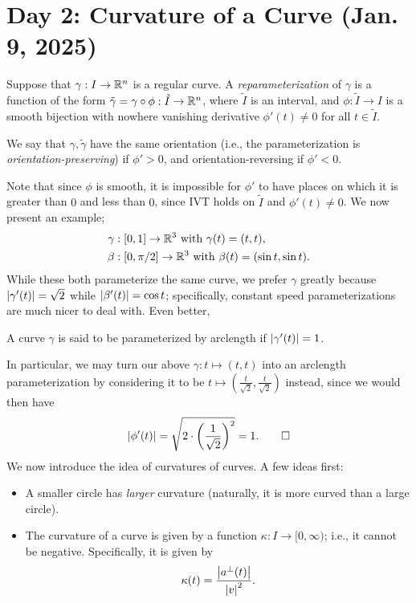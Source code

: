 \section{Day 2: Curvature of a Curve (Jan. 9, 2025)}
\begin{definition}
    Suppose that $\gamma : I \to \mathbb R^n$ is a regular curve. A \textit{reparameterization} of $\gamma$ is a function of the form $\tilde{\gamma} = \gamma \circ \phi : \tilde{I} \to \mathbb R^n$, where $\tilde{I}$ is an interval, and $\phi : \tilde{I} \to I$ is a smooth bijection with nowhere vanishing derivative $\phi'(t) \neq 0$ for all $t \in \tilde{I}$.
\end{definition}
\begin{definition}
    We say that $\gamma, \tilde{\gamma}$ have the same orientation (i.e., the parameterization is \textit{orientation-preserving}) if $\phi' > 0$, and orientation-reversing if $\phi' < 0$.
\end{definition}
\noindent Note that since $\phi$ is smooth, it is impossible for $\phi'$ to have places on which it is greater than $0$ and less than $0$, since IVT holds on $\tilde{I}$ and $\phi'(t) \neq 0$.
\medskip\newline
We now present an example;
\begin{align*}
    \gamma &: [0, 1] \to \mathbb R^3 \text{ with } \gamma(t) = (t, t), \\
    \beta &: [0, \pi/2] \to \mathbb R^3 \text{ with } \beta(t) = (\sin t, \sin t).
\end{align*}
While these both parameterize the same curve, we prefer $\gamma$ greatly because $\left\lvert \gamma'(t) \right\rvert = \sqrt{2}$ while $\left\lvert \beta'(t) \right\rvert = \cos t$; specifically, constant speed parameterizations are much nicer to deal with. Even better,
\begin{definition}
    A curve $\gamma$ is said to be parameterized by arclength if $\left\lvert \gamma'(t) \right\rvert = 1$.
\end{definition}
\noindent In particular, we may turn our above $\gamma : t \mapsto (t, t)$ into an arclength parameterization by considering it to be $t \mapsto (\frac{t}{\sqrt{2}}, \frac{t}{\sqrt{2}})$ instead, since we would then have
\[ \left\lvert \phi'(t) \right\rvert = \sqrt{2 \cdot \left(\frac{1}{\sqrt{2}}\right)^2} = 1. \qed \]
We now introduce the idea of curvatures of curves. A few ideas first:
\begin{itemize}
    \item A smaller circle has \textit{larger} curvature (naturally, it is more curved than a large circle).
    \item The curvature of a curve is given by a function $\kappa : I \to [0, \infty)$; i.e., it cannot be negative. Specifically, it is given by
    \[ \kappa(t) = \frac{\left\lvert a^\perp(t) \right\rvert}{\left\lvert v \right\rvert^2}. \]
\end{itemize}
